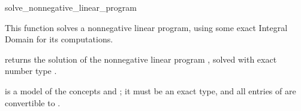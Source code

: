 \begin{ccRefFunction}{solve_nonnegative_linear_program}


This function solves a nonnegative linear program, using some exact
Integral Domain  for its computations.   

{returns the solution of the nonnegative linear program , solved
with exact number type .}

 is a model of the concepts  and
; it must
be an exact type, and all entries of  are convertible to 
.

\end{ccRefFunction}
